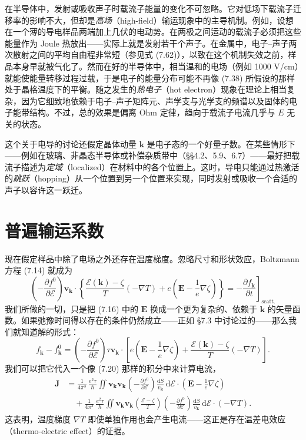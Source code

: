 在半导体中，发射或吸收声子时载流子能量的变化不可忽略。它对低场下载流子迁移率的影响不大，但却是\emph{高场}（high-field）输运现象中的主导机制。例如，设想在一个薄的导电样品两端加上几伏的电动势。在两极之间运动的载流子必须把这些能量作为 Joule 热放出——实际上就是发射若干个声子。在金属中，电子--声子两次散射之间的平均自由程非常短（参见式 (7.62)），以致在这个机制失效之前，样品本身早就被气化了。然而在好的半导体中，相当温和的电场（例如 1000 V/cm）就能使能量转移过程过载，于是电子的能量分布可能不再像 (7.38) 所假设的那样处于晶格温度下的平衡。随之发生的\emph{热电子}（hot electron）现象在理论上相当复杂，因为它细致地依赖于电子--声子矩阵元、声学支与光学支的频谱以及固体的电子能带结构。不过，总的效果是偏离 Ohm 定律，趋向于载流子电流几乎与 $E$ 无关的状态。

这个关于电导的讨论还假定晶体动量 $\mathbf{k}$ 是电子态的一个好量子数。在某些情形下——例如在玻璃、非晶态半导体或补偿杂质带中（§§4.2、5.9、6.7）——最好把载流子描述为\emph{定域}（localized）在材料中的各个位置上。这时，导电只能通过热激活的\emph{跳跃}（hopping）从一个位置到另一个位置来实现，同时发射或吸收一个合适的声子以容许这一跃迁。

\section{普遍输运系数}

现在假定样品中除了电场之外还存在温度梯度。忽略尺寸和形状效应，Boltzmann 方程 (7.14) 就成为
\begin{equation*}
\left(-\frac{\partial f^{0}}{\partial\mathcal{E}}\right)\mathbf{v}_{\mathbf{k}}\cdot\left\{\frac{\mathcal{E}(\mathbf{k})-\zeta}{T}(-\nabla T)+e\left(\mathbf{E}-\frac{1}{e}\nabla\zeta\right)\right\}=-\left.\frac{\partial f_{\mathbf{k}}}{\partial t}\right]_{\text{scatt.}}\tag{7.77}
\end{equation*}
我们所做的一切，只是把 (7.16) 中的 $\mathbf{E}$ 换成一个更为复杂的、依赖于 $\mathbf{k}$ 的矢量函数。如果弛豫时间得以存在的条件仍然成立——正如 §7.3 中讨论过的——那么我们就知道解的形式：
\begin{equation*}
f_{\mathbf{k}}-f^{0}_{\mathbf{k}}=\left(-\frac{\partial f^{0}}{\partial\mathcal{E}}\right)\tau\mathbf{v}_{\mathbf{k}}\cdot\left[e\left(\mathbf{E}-\frac{1}{e}\nabla\zeta\right)+\frac{\mathcal{E}(\mathbf{k})-\zeta}{T}(-\nabla T)\right].\tag{7.78}
\end{equation*}
我们可以把它代入一个像 (7.20) 那样的积分中来计算电流，
\begin{align*}
\mathbf{J}&=\frac{1}{4\pi^{3}}\,\frac{e^{2}\tau}{\hbar}\iint\mathbf{v}_{\mathbf{k}}\mathbf{v}_{\mathbf{k}}\left(-\frac{\partial f^{0}}{\partial\mathcal{E}}\right)\frac{\mathrm{d}S}{v_{\mathbf{k}}}\,\mathrm{d}\mathcal{E}\cdot\left(\mathbf{E}-\frac{1}{e}\nabla\zeta\right)\\
&\quad+\frac{1}{4\pi^{3}}\,\frac{e^{2}\tau}{\hbar}\iint\mathbf{v}_{\mathbf{k}}\mathbf{v}_{\mathbf{k}}\left(\frac{\mathcal{E}-\zeta}{T}\right)\left(-\frac{\partial f^{0}}{\partial\mathcal{E}}\right)\frac{\mathrm{d}S}{v_{\mathbf{k}}}\,\mathrm{d}\mathcal{E}\cdot(-\nabla T).\tag{7.79}
\end{align*}
这表明，温度梯度 $\nabla T$ 即使单独作用也会产生电流——这正是存在温差电效应（thermo-electric effect）的证据。

